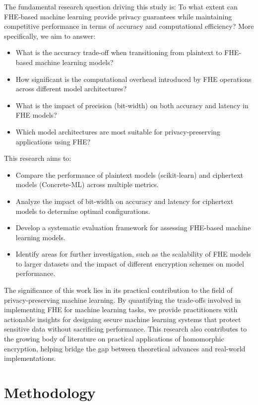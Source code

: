 \documentclass[a4paper,12pt]{article}
\begin{document}
The fundamental research question driving this study is: To what extent can FHE-based machine learning provide privacy guarantees while maintaining competitive performance in terms of accuracy and computational efficiency? More specifically, we aim to answer:

\begin{itemize}
    \item What is the accuracy trade-off when transitioning from plaintext to FHE-based machine learning models?
    \item How significant is the computational overhead introduced by FHE operations across different model architectures?
    \item What is the impact of precision (bit-width) on both accuracy and latency in FHE models?
    \item Which model architectures are most suitable for privacy-preserving applications using FHE?
\end{itemize}

This research aims to:
\begin{itemize}
    \item Compare the performance of plaintext models (scikit-learn) and ciphertext models (Concrete-ML) across multiple metrics.
    \item Analyze the impact of bit-width on accuracy and latency for ciphertext models to determine optimal configurations.
    \item Develop a systematic evaluation framework for assessing FHE-based machine learning models.
    \item Identify areas for further investigation, such as the scalability of FHE models to larger datasets and the impact of different encryption schemes on model performance.
\end{itemize}

The significance of this work lies in its practical contribution to the field of privacy-preserving machine learning. By quantifying the trade-offs involved in implementing FHE for machine learning tasks, we provide practitioners with actionable insights for designing secure machine learning systems that protect sensitive data without sacrificing performance. This research also contributes to the growing body of literature on practical applications of homomorphic encryption, helping bridge the gap between theoretical advances and real-world implementations.

\section{Methodology}
\end{document}
